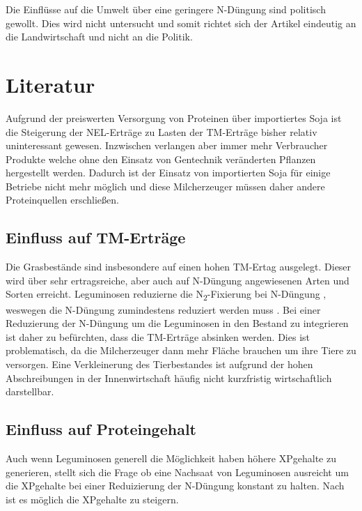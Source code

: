 \documentclass[12pt,titlepage]{scrartcl}
\begin{document}
Die Einflüsse auf die Umwelt über eine geringere N-Düngung sind politisch gewollt.
Dies wird nicht untersucht und somit richtet sich der Artikel eindeutig an die Landwirtschaft und nicht an die Politik.


\section{Literatur}
\label{sec:Literatur}

Aufgrund der preiswerten Versorgung von Proteinen über importiertes Soja ist die Steigerung der \ac{NEL}-Erträge zu Lasten der \ac{TM}-Erträge bisher relativ uninteressant gewesen.
Inzwischen verlangen aber immer mehr Verbraucher Produkte welche ohne den Einsatz von Gentechnik veränderten Pflanzen hergestellt werden.
Dadurch ist der Einsatz von importierten Soja für einige Betriebe nicht mehr möglich und diese Milcherzeuger müssen daher andere Proteinquellen erschließen.

\subsection{Einfluss auf TM-Erträge}
\label{subsec:TM}

Die Grasbestände sind insbesondere auf einen hohen \ac{TM}-Ertag ausgelegt.
Dieser wird über sehr ertragsreiche, aber auch auf N-Düngung angewiesenen Arten und Sorten erreicht.
Leguminosen reduzierne die N\textsubscript{2}-Fixierung bei N-Düngung \parencite{ledgard2001nitrogen}, weswegen die N-Düngung zumindestens reduziert werden muss \parencite[34]{weggler2050leguminosen}.
Bei einer Reduzierung der N-Düngung um die Leguminosen in den Bestand zu integrieren ist daher zu befürchten, dass die \ac{TM}-Erträge absinken werden.
Dies ist problematisch, da die Milcherzeuger dann mehr Fläche brauchen um ihre Tiere zu versorgen.
Eine Verkleinerung des Tierbestandes ist aufgrund der hohen Abschreibungen in der Innenwirtschaft häufig nicht kurzfristig wirtschaftlich darstellbar.

\subsection{Einfluss auf Proteingehalt}
\label{subsec:Protein}

Auch wenn Leguminosen generell die Möglichkeit haben höhere \ac{XP}gehalte zu generieren, stellt sich die Frage ob eine Nachsaat von Leguminosen ausreicht um die \ac{XP}gehalte bei einer Reduizierung der N-Düngung konstant zu halten.
Nach \textcite[35]{weggler2050leguminosen} ist es möglich die \ac{XP}gehalte zu steigern.
\end{document}
